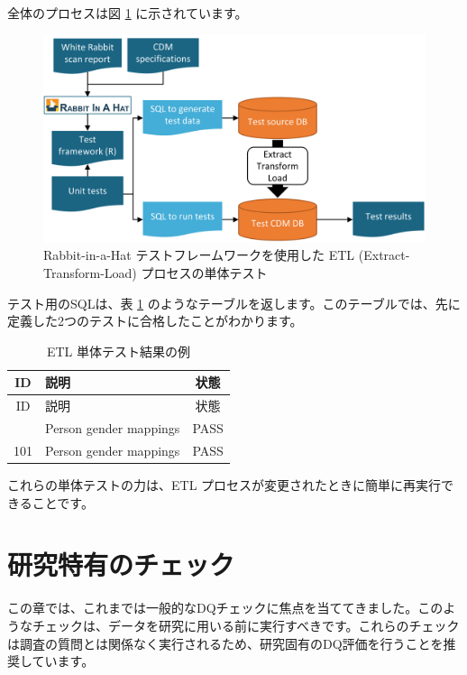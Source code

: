 \documentclass[
  11pt]{book}
\theoremstyle{definition}
\theoremstyle{definition}
\theoremstyle{definition}
\theoremstyle{definition}
\theoremstyle{remark}
\begin{document}
全体のプロセスは図 \ref{fig:testFramework} に示されています。

\begin{figure}

{\centering \includegraphics[width=0.9\linewidth]{images/DataQuality/testFramework} 

}

\caption{Rabbit-in-a-Hat テストフレームワークを使用した ETL (Extract-Transform-Load) プロセスの単体テスト}\label{fig:testFramework}
\end{figure}

テスト用のSQLは、表 \ref{tab:exampleTestResults} のようなテーブルを返します。このテーブルでは、先に定義した2つのテストに合格したことがわかります。

\begin{longtable}[]{@{}clc@{}}
\caption{\label{tab:exampleTestResults} ETL 単体テスト結果の例}\tabularnewline
\toprule\noalign{}
ID & 説明 & 状態 \\
\midrule\noalign{}
\endfirsthead
\toprule\noalign{}
ID & 説明 & 状態 \\
\midrule\noalign{}
\endhead
\bottomrule\noalign{}
\endlastfoot
101 & Person gender mappings & PASS \\
101 & Person gender mappings & PASS \\
\end{longtable}

これらの単体テストの力は、ETL プロセスが変更されたときに簡単に再実行できることです。

\section{研究特有のチェック}\label{ux7814ux7a76ux7279ux6709ux306eux30c1ux30a7ux30c3ux30af}


この章では、これまでは一般的なDQチェックに焦点を当ててきました。このようなチェックは、データを研究に用いる前に実行すべきです。これらのチェックは調査の質問とは関係なく実行されるため、研究固有のDQ評価を行うことを推奨しています。
\end{document}

